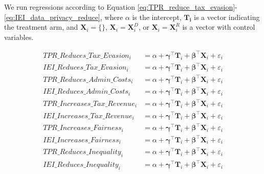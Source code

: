 \documentclass[11pt]{article}
\begin{document}
We run regressions according to Equation \ref{eq:TPR_reduce_tax_evasion}-\ref{eq:IEI_data_privacy_reduce}, where $\alpha$ is the intercept, $\mathbf{T_i}$ is a vector indicating the treatment arm, and $\mathbf{X}_{i} = \{\}$, $\mathbf{X}_{i} = \mathbf{X}_{i}^{D}$, or  $\mathbf{X}_{i} = \mathbf{X}_{i}^{R}$ is a vector with control variables. 

\begin{center}
\begin{align}
    \label{eq:TPR_reduce_tax_evasion}
    \text{$TPR\_Reduces\_Tax\_Evasion_i$} 
    &= \alpha + \boldsymbol{\gamma}^{\top}\mathbf{T}_i + \boldsymbol{\beta}^{\top}\mathbf{X}_{i} + \varepsilon_{i} \\[0.25em]
    \text{$IEI\_Reduces\_Tax\_Evasion_i$} 
    &= \alpha + \boldsymbol{\gamma}^{\top}\mathbf{T}_i + \boldsymbol{\beta}^{\top}\mathbf{X}_{i} + \varepsilon_{i} \\[0.5em]
    \text{$TPR\_Reduces\_Admin\_Costs_i$} 
    &= \alpha + \boldsymbol{\gamma}^{\top}\mathbf{T}_i + \boldsymbol{\beta}^{\top}\mathbf{X}_{i} +  \varepsilon_{i} \\[0.25em]
    \text{$IEI\_Reduces\_Admin\_Costs_i$} 
    &= \alpha + \boldsymbol{\gamma}^{\top}\mathbf{T}_i + \boldsymbol{\beta}^{\top}\mathbf{X}_{i} +  \varepsilon_{i} \\[0.5em]
    \text{$TPR\_Increases\_Tax\_Revenue_i$} 
    &= \alpha + \boldsymbol{\gamma}^{\top}\mathbf{T}_i + \boldsymbol{\beta}^{\top}\mathbf{X}_{i} + \varepsilon_{i} \\[0.25em]
    \text{$IEI\_Increases\_Tax\_Revenue_i$} 
    &= \alpha + \boldsymbol{\gamma}^{\top}\mathbf{T}_i + \boldsymbol{\beta}^{\top}\mathbf{X}_{i} + \varepsilon_{i} \\[0.5em]
    \text{$TPR\_Increases\_Fairness_i$} 
    &= \alpha + \boldsymbol{\gamma}^{\top}\mathbf{T}_i + \boldsymbol{\beta}^{\top}\mathbf{X}_{i} +  \varepsilon_{i} \\[0.25em]
    \text{$IEI\_Increases\_Fairness_i$} 
    &= \alpha + \boldsymbol{\gamma}^{\top}\mathbf{T}_i + \boldsymbol{\beta}^{\top}\mathbf{X}_{i} +  \varepsilon_{i} \\[0.5em]
    \text{$TPR\_Reduces\_Inequality_i$} 
    &= \alpha + \boldsymbol{\gamma}^{\top}\mathbf{T}_i + \boldsymbol{\beta}^{\top}\mathbf{X}_{i} + \varepsilon_{i} \\[0.25em]
    \text{$IEI\_Reduces\_Inequality_i$} 
    &= \alpha + \boldsymbol{\gamma}^{\top}\mathbf{T}_i + \boldsymbol{\beta}^{\top}\mathbf{X}_{i} + \varepsilon_{i} \\[0.5em]

\end{align}
\end{center}
\end{document}
